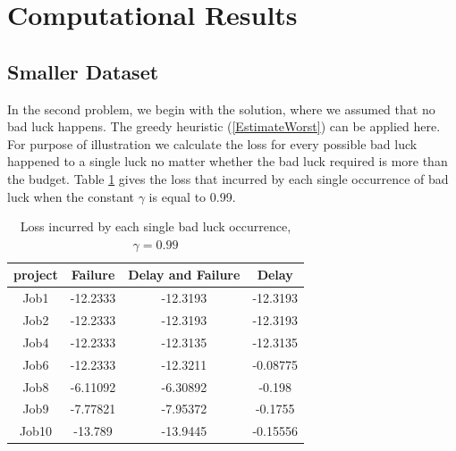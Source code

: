 \documentclass[final,3p,times]{elsarticle}
\begin{document}
\section{Computational Results}
\subsection{Smaller Dataset}
In the second problem, we begin with the solution, where we assumed that no bad luck happens. The greedy heuristic (\ref{EstimateWorst}) can be applied here. For purpose of illustration we calculate the loss for every possible bad luck happened to a single luck no matter whether the bad luck required is more than the budget. Table \ref{TableLossIncurGammap99} gives the loss that incurred by each single occurrence of bad luck when the constant $\gamma$ is equal to 0.99.

\begin{table}[H]
	\centering
	\begin{tabular}{|c|c|c|c|}
		\hline
		project & Failure & Delay and Failure & Delay \\
		\hline
		Job1 & -12.2333 & -12.3193 & -12.3193 \\
		\hline
		Job2 & -12.2333 & -12.3193 & -12.3193 \\
		\hline
		Job4 & -12.2333 & -12.3135 & -12.3135 \\
		\hline
		Job6 & -12.2333 & -12.3211 & -0.08775 \\
		\hline
		Job8 & -6.11092 & -6.30892 & -0.198 \\
		\hline
		Job9 & -7.77821 & -7.95372 & -0.1755 \\
		\hline
		Job10 & -13.789 & -13.9445 & -0.15556 \\
		\hline
	\end{tabular}
	\caption{Loss incurred by each single bad luck occurrence, $\gamma=0.99$}
	\label{TableLossIncurGammap99}
\end{table}
\end{document}
